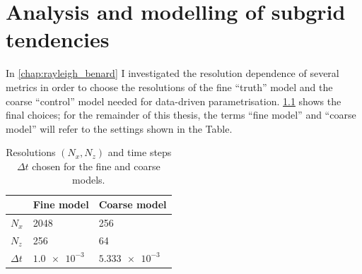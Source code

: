 \documentclass[../main.tex]{subfiles}
\begin{document}
\ifSubfilesClassLoaded{
    \frontmatter
    \tableofcontents
    \mainmatter
}{}

\chapter{Analysis and modelling of subgrid tendencies}
\label{chap:tendencies}
\setlength{\epigraphwidth}{.45\textwidth}


In \cref{chap:rayleigh_benard} I investigated the resolution dependence
of several metrics in order to choose the resolutions of the fine ``truth''
model and the coarse ``control'' model needed for data-driven parametrisation.
\cref{tab:final_resolutions} shows the final choices; for the remainder
of this thesis, the terms ``fine model'' and ``coarse model'' will refer
to the settings shown in the Table.

\begin{table}[ht]
\centering
\begin{tabular}{l l l}
    \toprule
    & \textbf{Fine model} & \textbf{Coarse model} \\
    \midrule
    $N_x$ & 2048 & 256 \\
    $N_z$ & 256 & 64 \\
    $\Delta t$ & $\SI{1.0e-3}{}$ & $\SI{5.333e-3}{}$ \\
    \bottomrule
\end{tabular}
\caption{
    Resolutions $(N_x, N_z)$ and time steps $\Delta t$ chosen for the fine and
    coarse models.
}
\label{tab:final_resolutions}
\end{table}
\end{document}
